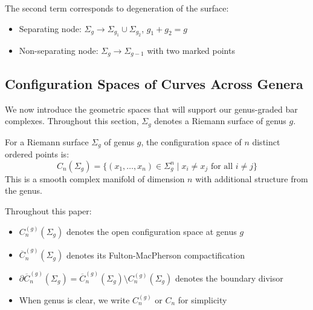 The second term corresponds to degeneration of the surface:
\begin{itemize}
\item Separating node: $\Sigma_g \to \Sigma_{g_1} \cup \Sigma_{g_2}$, $g_1 + g_2 = g$
\item Non-separating node: $\Sigma_g \to \Sigma_{g-1}$ with two marked points
\end{itemize}

\subsection{Configuration Spaces of Curves Across Genera}
 
We now introduce the geometric spaces that will support our genus-graded bar complexes. Throughout this section, $\Sigma_g$ denotes a Riemann surface of genus $g$.
 
\begin{definition}
For a Riemann surface $\Sigma_g$ of genus $g$, the configuration space of $n$ distinct ordered points is:
\[
C_n(\Sigma_g) = \{(x_1, \ldots, x_n) \in \Sigma_g^n \mid x_i \neq x_j \text{ for all } i \neq j\}
\]
This is a smooth complex manifold of dimension $n$ with additional structure from the genus.

\begin{notation}
Throughout this paper:
\begin{itemize}
\item $C_n^{(g)}(\Sigma_g)$ denotes the open configuration space at genus $g$
\item $\overline{C}_n^{(g)}(\Sigma_g)$ denotes its Fulton-MacPherson compactification  
\item $\partial\overline{C}_n^{(g)}(\Sigma_g) = \overline{C}_n^{(g)}(\Sigma_g) \setminus C_n^{(g)}(\Sigma_g)$ denotes the boundary divisor
\item When genus is clear, we write $C_n^{(g)}$ or $C_n$ for simplicity
\end{itemize}
\end{notation}

\end{definition}
 
